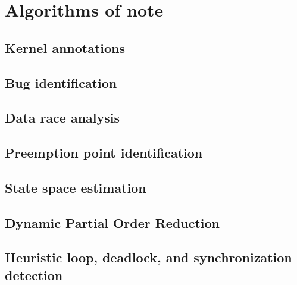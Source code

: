 \section{Algorithms of note}

\subsection{Kernel annotations}
\subsection{Bug identification}
\subsection{Data race analysis}
\subsection{Preemption point identification}
\subsection{State space estimation}
\subsection{Dynamic Partial Order Reduction}
\subsection{Heuristic loop, deadlock, and synchronization detection}
